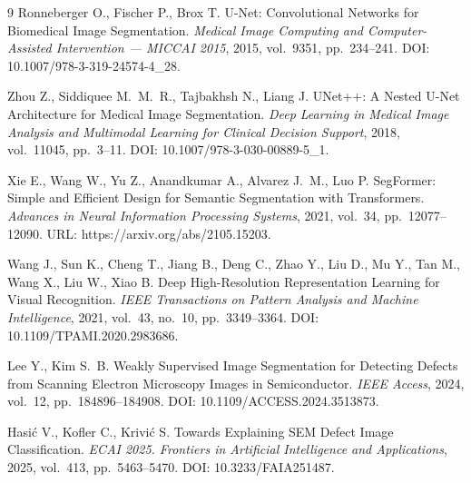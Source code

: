 \documentclass{misisarticle}
\begin{document}
	\begin{thebibliography}{9}
		 Ronneberger O., Fischer P., Brox T. U-Net: Convolutional Networks for Biomedical Image Segmentation. \textit{Medical Image Computing and Computer-Assisted Intervention --- MICCAI 2015}, 2015, vol.~9351, pp.~234--241. DOI: 10.1007/978-3-319-24574-4\_28.
		
		 Zhou Z., Siddiquee M.~M.~R., Tajbakhsh N., Liang J. UNet++: A Nested U-Net Architecture for Medical Image Segmentation. \textit{Deep Learning in Medical Image Analysis and Multimodal Learning for Clinical Decision Support}, 2018, vol.~11045, pp.~3--11. DOI: 10.1007/978-3-030-00889-5\_1.
		
		 Xie E., Wang W., Yu Z., Anandkumar A., Alvarez J.~M., Luo P. SegFormer: Simple and Efficient Design for Semantic Segmentation with Transformers. \textit{Advances in Neural Information Processing Systems}, 2021, vol.~34, pp.~12077--12090. URL: https://arxiv.org/abs/2105.15203.
		
		 Wang J., Sun K., Cheng T., Jiang B., Deng C., Zhao Y., Liu D., Mu Y., Tan M., Wang X., Liu W., Xiao B. Deep High-Resolution Representation Learning for Visual Recognition. \textit{IEEE Transactions on Pattern Analysis and Machine Intelligence}, 2021, vol.~43, no.~10, pp.~3349--3364. DOI: 10.1109/TPAMI.2020.2983686.
		
		 Lee Y., Kim S.~B. Weakly Supervised Image Segmentation for Detecting Defects from Scanning Electron Microscopy Images in Semiconductor. \textit{IEEE Access}, 2024, vol.~12, pp.~184896--184908. DOI: 10.1109/ACCESS.2024.3513873.
				
		 Hasić V., Kofler C., Krivić S. Towards Explaining SEM Defect Image Classification. \textit{ECAI 2025. Frontiers in Artificial Intelligence and Applications}, 2025, vol.~413, pp.~5463--5470. DOI: 10.3233/FAIA251487.
		
	\end{thebibliography}
	
\end{document}
